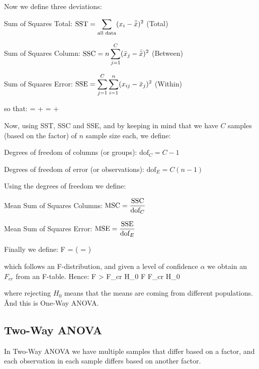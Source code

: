 Now we define three deviations:

\bit
\item Sum of Squares Total: $\displaystyle \text{SST} = \sum_{\text{all data}} (x_{i} - \bar{\bar{x}})^{2}$ \:\: (Total)
\item Sum of Squares Column: $\displaystyle \text{SSC} = n \sum_{j=1}^{C} (\bar{x}_{j} - \bar{\bar{x}})^{2}$ \:\: (Between)
\item Sum of Squares Error: $\displaystyle \text{SSE} = \sum_{j=1}^{C} \sum_{i=1}^{n} (x_{ij} - \bar{x}_{j})^{2}$ \:\:
(Within)
\eit

so that:
\bse
{} =  +  \qquad {} \qquad
{} =  + 
\ese

Now, using SST, SSC and SSE, and by keeping in mind that we have $C$ samples (based on the factor) of $n$ sample
size each, we define:

\bit
\item Degrees of freedom of columns (or groups): $\text{dof}_{C} = C - 1$
\item Degrees of freedom of error (or observations): $\text{dof}_{E} = C(n - 1)$
\eit

Using the degrees of freedom we define:

\bit
\item Mean Sum of Squares Columns: $\displaystyle \text{MSC} = \frac{\text{SSC}}{\text{dof}_{C}}$
\item Mean Sum of Squares Error: $\displaystyle \text{MSE} = \frac{\text{SSE}}{\text{dof}_{E}}$
\eit

Finally we define:
\bse
F =  \qquad \Big( =  \Big)
\ese

which follows an F-distribution, and given a level of confidence $\alpha$ we obtain an $F_{cr}$ from an F-table.
Hence:
\bse
F > F_{cr} \imp {} H_{0} \qquad \qquad F \leq F_{cr} \imp {} H_{0}
\ese

where rejecting $H_{0}$ means that the means are coming from different populations. \v

And this is One-Way ANOVA\@.

\subsection{Two-Way ANOVA}

In Two-Way ANOVA we have multiple samples that differ based on a factor, and each observation in each sample
differs based on another factor.

